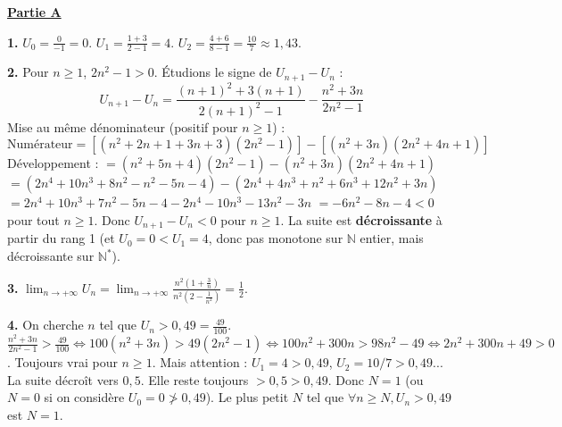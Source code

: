 \documentclass[11pt]{article}
\begin{document}
\begin{exoresolu}
\underline{\textbf{Partie A}}\par
\textbf{1.} $U_0 = \frac{0}{-1} = 0$. \quad $U_1 = \frac{1+3}{2-1} = 4$. \quad $U_2 = \frac{4+6}{8-1} = \frac{10}{7} \approx 1,43$.\par
\textbf{2.} Pour $n \ge 1$, $2n^2-1 > 0$. Étudions le signe de $U_{n+1} - U_n$ :
\[
U_{n+1} - U_n = \frac{(n+1)^2+3(n+1)}{2(n+1)^2-1} - \frac{n^2+3n}{2n^2-1}
\]
Mise au même dénominateur (positif pour $n\ge 1$) :
\[
\text{Numérateur} = [(n^2+2n+1+3n+3)(2n^2-1)] - [(n^2+3n)(2n^2+4n+1)]
\]
Développement :
$= (n^2+5n+4)(2n^2-1) - (n^2+3n)(2n^2+4n+1)$
$= (2n^4 + 10n^3 + 8n^2 - n^2 -5n -4) - (2n^4 + 4n^3 + n^2 + 6n^3 + 12n^2 + 3n)$
$= 2n^4 + 10n^3 + 7n^2 -5n -4 - 2n^4 - 10n^3 - 13n^2 - 3n$
$= -6n^2 -8n -4 < 0$ pour tout $n \ge 1$.
Donc $U_{n+1} - U_n < 0$ pour $n \ge 1$. La suite est \textbf{décroissante} à partir du rang 1 (et $U_0=0 < U_1=4$, donc pas monotone sur $\mathbb{N}$ entier, mais décroissante sur $\mathbb{N}^*$).\par
\textbf{3.} $\lim_{n\to+\infty} U_n = \lim_{n\to+\infty} \frac{n^2(1+\frac{3}{n})}{n^2(2-\frac{1}{n^2})} = \frac{1}{2}$.\par
\textbf{4.} On cherche $n$ tel que $U_n > 0,49 = \frac{49}{100}$.
$\frac{n^2+3n}{2n^2-1} > \frac{49}{100} \iff 100(n^2+3n) > 49(2n^2-1) \iff 100n^2+300n > 98n^2-49 \iff 2n^2+300n+49 > 0$.
Toujours vrai pour $n \ge 1$. Mais attention : $U_1=4 > 0,49$, $U_2=10/7>0,49$... La suite décroît vers $0,5$. Elle reste toujours $> 0,5 > 0,49$.
Donc $N=1$ (ou $N=0$ si on considère $U_0=0 \not> 0,49$). Le plus petit $N$ tel que $\forall n\ge N, U_n>0,49$ est \textbf{$N=1$}.


\end{exoresolu}
\end{document}
